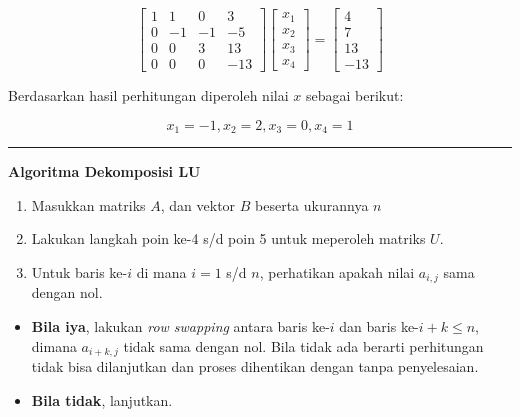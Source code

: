 \documentclass[
]{book}
\providecommand{\tightlist}{%
  \setlength{\itemsep}{0pt}\setlength{\parskip}{0pt}}
\theoremstyle{definition}
\theoremstyle{definition}
\theoremstyle{definition}
\theoremstyle{definition}
\theoremstyle{remark}
\begin{document}
\begin{equation*}
\begin{bmatrix}
     1       & 1       & 0       & 3           \\[0.3em]
     0       & -1      & -1      & -5          \\[0.3em]
     0       & 0       & 3       & 13          \\[0.3em]
     0       & 0       & 0       & -13
     \end{bmatrix}
\begin{bmatrix}
     x_1                                          \\[0.3em]
     x_2                                          \\[0.3em]
     x_3                                          \\[0.3em]
     x_4                                       
     \end{bmatrix}
= \begin{bmatrix}
     4                                          \\[0.3em]
     7                                          \\[0.3em]
     13                                          \\[0.3em]
     -13                      
     \end{bmatrix}
\end{equation*}

Berdasarkan hasil perhitungan diperoleh nilai \(x\) sebagai berikut:

\[
x_1=-1, x_2=2, x_3=0, x_4=1
\]

\begin{center}\rule{0.5\linewidth}{0.5pt}\end{center}

\textbf{Algoritma Dekomposisi LU}

\begin{enumerate}
\def\labelenumi{\arabic{enumi}.}
\tightlist
\item
  Masukkan matriks \(A\), dan vektor \(B\) beserta ukurannya \(n\)
\item
  Lakukan langkah poin ke-4 s/d poin 5 untuk meperoleh matriks \(U\).
\item
  Untuk baris ke-\(i\) di mana \(i=1\) s/d \(n\), perhatikan apakah nilai \(a_{i,j}\) sama dengan nol.
\end{enumerate}

\begin{itemize}
\tightlist
\item
  \textbf{Bila iya}, lakukan \emph{row swapping} antara baris ke-\(i\) dan baris ke-\(i+k\leq n\), dimana \(a_{i+k,j}\) tidak sama dengan nol. Bila tidak ada berarti perhitungan tidak bisa dilanjutkan dan proses dihentikan dengan tanpa penyelesaian.
\item
  \textbf{Bila tidak}, lanjutkan.
\end{itemize}
\end{document}
